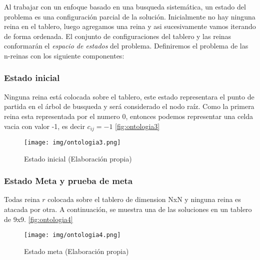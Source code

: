 \documentclass[conference]{IEEEtran}
\begin{document}
Al trabajar con un enfoque basado en una busqueda sistemática, un estado del problema es una configuración parcial de la solución. Inicialmente no hay ninguna reina en el tablero, luego agregamos una reina y asi sucesivamente vamos iterando de forma ordenada. El conjunto de configuraciones del tablero y las reinas conformarán el \textit{espacio de estados} del problema. Definiremos el problema de las n-reinas con los siguiente componentes:\\

\subsubsection{Estado inicial}\label{AA_2}
Ninguna reina está colocada sobre el tablero, este estado representara el punto de partida en el árbol de busqueda y será considerado el nodo raíz. Como la primera reina esta representada por el numero $0$, entonces podemos representar una celda vacia con valor -1, es decir $c_{ij} = -1$
\autoref{fig:ontologia3}

\begin{figure}[h]
    \centering
    \texttt{[image: img/ontologia3.png]}
    \caption{Estado inicial (Elaboración propia)}
    \label{fig:ontologia3}
\end{figure}

\subsubsection{Estado Meta y prueba de meta}\label{AA_3}
Todas reina $r$ colocada sobre el tablero de dimension NxN y ninguna reina es atacada por otra. A continuación, se muestra una de las soluciones en un tablero de 9x9.
\autoref{fig:ontologia4}

\begin{figure}[h]
    \centering
    \texttt{[image: img/ontologia4.png]}
    \caption{Estado meta (Elaboración propia)}
    \label{fig:ontologia4}
\end{figure}
\end{document}
